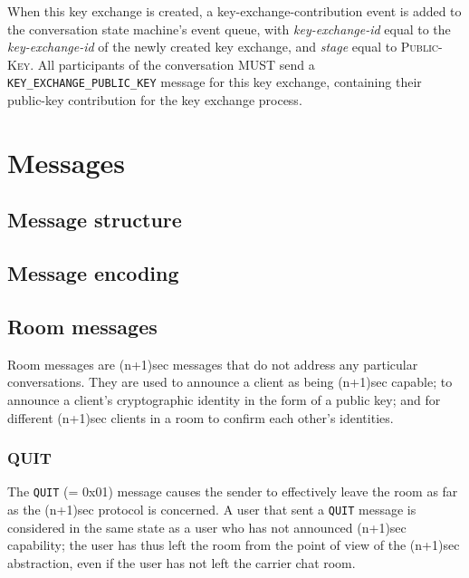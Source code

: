 \documentclass{article}
\def\npmessage#1{\texttt{#1}}
\def\smfield#1{\textsl{#1}}
\def\type#1{\textsf{#1}}
\begin{document}
When this key exchange is created, a \type{key-exchange-contribution} event is added to the conversation state machine's event queue, with \smfield{key-exchange-id} equal to the \smfield{key-exchange-id} of the newly created key exchange, and \smfield{stage} equal to \textsc{Public-Key}.
All participants of the conversation MUST send a \npmessage{KEY\_EXCHANGE\_PUBLIC\_KEY} message for this key exchange, containing their public-key contribution for the key exchange process.



\section{Messages}
\label{sec:messages}


\subsection{Message structure}
\label{sec:messages/message-structure}



\subsection{Message encoding}
\label{sec:messages/message-encoding}



\subsection{Room messages}
\label{sec:messages/room-messages}

Room messages are (n+1)sec messages that do not address any particular conversations.
They are used to announce a client as being (n+1)sec capable; to announce a client's cryptographic identity in the form of a public key; and for different (n+1)sec clients in a room to confirm each other's identities.


\subsubsection{QUIT}
\label{sec:messages/quit}

The \npmessage{QUIT} (= 0x01) message causes the sender to effectively leave the room as far as the (n+1)sec protocol is concerned.
A user that sent a \npmessage{QUIT} message is considered in the same state as a user who has not announced (n+1)sec capability; the user has thus left the room from the point of view of the (n+1)sec abstraction, even if the user has not left the carrier chat room.
\end{document}
